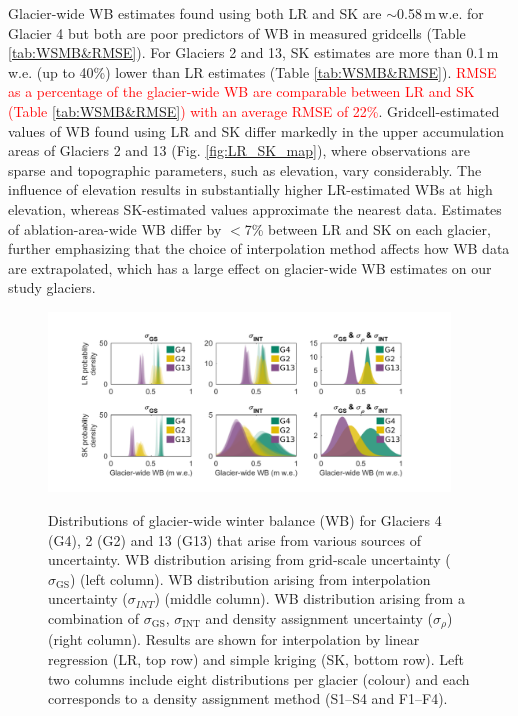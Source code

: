 \documentclass[twocolumn, letterpaper]{igs}
\begin{document}
Glacier-wide WB estimates found using both LR and SK are $\sim$0.58\,m\,w.e. for Glacier 4 but both are poor predictors of  WB in measured gridcells (Table \ref{tab:WSMB&RMSE}). For Glaciers 2 and 13, SK estimates are more than 0.1\,m\,w.e. (up to 40\%) lower than LR estimates (Table \ref{tab:WSMB&RMSE}). \textcolor{red}{RMSE as a percentage of the glacier-wide WB are comparable between LR and SK (Table \ref{tab:WSMB&RMSE}) with an average RMSE of 22\%}. Gridcell-estimated values of WB found using LR and SK differ markedly in the upper accumulation areas of Glaciers 2 and 13 (Fig. \ref{fig:LR_SK_map}), where observations are sparse and topographic parameters, such as elevation, vary considerably. The influence of elevation results in substantially higher LR-estimated WBs at high elevation, whereas SK-estimated values approximate the nearest data. Estimates of ablation-area-wide WB differ by $<$7\% between LR and SK on each glacier, further emphasizing that the choice of interpolation method affects how WB data are extrapolated, which has a large effect on glacier-wide WB estimates on our study glaciers. 

\begin{figure}
	\centering
	\includegraphics[width =0.95\textwidth]{WSMBDist.pdf}\\
	\caption{Distributions of glacier-wide winter balance (WB) for Glaciers 4 (G4), 2 (G2) and 13 (G13) that arise from various sources of uncertainty. WB distribution arising from grid-scale uncertainty ($\sigma_{\mathrm{GS}}$) (left column). WB distribution arising from interpolation uncertainty ($\sigma_{INT}$) (middle column). WB distribution arising from a combination of $\sigma_{\mathrm{GS}}$, $\sigma_{\mathrm{INT}}$ and density assignment uncertainty ($\sigma_{\rho}$) (right column). Results are shown for interpolation by linear regression (LR, top row) and simple kriging (SK, bottom row). Left two columns include eight distributions per glacier (colour) and each corresponds to a density assignment method (S1--S4 and F1--F4).}
	\label{fig:WSMBDist_LR}
\end{figure}
\end{document}
